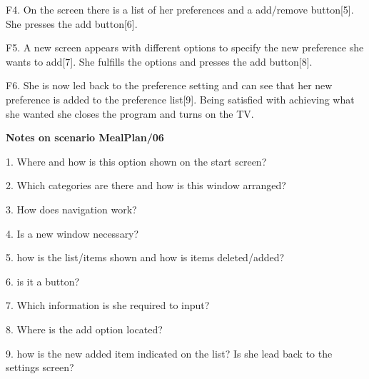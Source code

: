 	F4. On the screen there is a list of her preferences and a add/remove button[5]. She presses the add button[6].
	
	F5. A new screen appears with different options to specify the new preference she wants to add[7]. She fulfills the options and presses the add button[8].
	
	F6. She is now led back to the preference setting and can see that her new preference is added to the preference list[9]. Being satisfied with achieving what she wanted she closes the program and turns on the TV.
	 
\textbf{Notes on scenario MealPlan/06}

1. Where and how is this option shown on the start screen? 

2. Which categories are there and how is this window arranged?

3. How does navigation work?

4. Is a new window necessary?

5. how is the list/items shown and how is items deleted/added?

6. is it a button?

7. Which information is she required to input?

8. Where is the add option located?

9. how is the new added item indicated on the list? Is she lead back to the settings screen?

